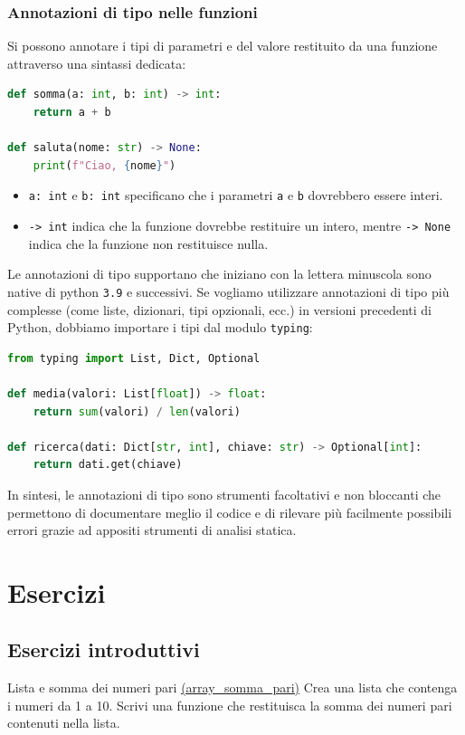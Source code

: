 \subsubsection*{Annotazioni di tipo nelle funzioni}

Si possono annotare i tipi di parametri e del valore restituito da una funzione attraverso una sintassi dedicata:

\begin{lstlisting}[language = python, frame = none]
def somma(a: int, b: int) -> int:
    return a + b

def saluta(nome: str) -> None:
    print(f"Ciao, {nome}")
\end{lstlisting}

\begin{itemize}
	\item \texttt{a: int} e \texttt{b: int} specificano che i parametri \texttt{a} e \texttt{b} dovrebbero essere interi.
	\item \texttt{-> int} indica che la funzione dovrebbe restituire un intero, mentre \texttt{-> None} indica che la funzione non restituisce nulla.
\end{itemize}

Le annotazioni di tipo supportano che iniziano con la lettera minuscola sono native di python \verb|3.9| e successivi. Se vogliamo utilizzare annotazioni di tipo più complesse (come liste, dizionari, tipi opzionali, ecc.) in versioni precedenti di Python, dobbiamo importare i tipi dal modulo \texttt{typing}:
\begin{lstlisting}[language = python, frame = none]
from typing import List, Dict, Optional

def media(valori: List[float]) -> float:
    return sum(valori) / len(valori)

def ricerca(dati: Dict[str, int], chiave: str) -> Optional[int]:
    return dati.get(chiave)
\end{lstlisting}

In sintesi, le annotazioni di tipo sono strumenti facoltativi e non bloccanti che permettono di documentare meglio il codice e di rilevare più facilmente possibili errori grazie ad appositi strumenti di analisi statica.

\section{Esercizi}
\subsection{Esercizi introduttivi}
\begin{esercizio}{Lista e somma dei numeri pari \href{run:./files/python/array_somma_pari/}{(array\_somma\_pari)}}
	Crea una lista che contenga i numeri da 1 a 10. Scrivi una funzione che restituisca la somma dei numeri pari contenuti nella lista.
\end{esercizio} \label{array_somma_pari}

